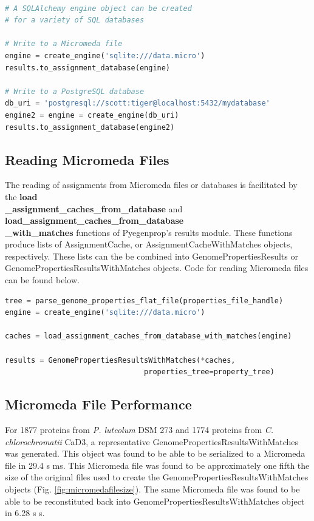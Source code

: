 \begin{lstlisting}[language=Python]  

# A SQLAlchemy engine object can be created
# for a variety of SQL databases

# Write to a Micromeda file
engine = create_engine('sqlite:///data.micro')
results.to_assignment_database(engine)

# Write to a PostgreSQL database
db_uri = 'postgresql://scott:tiger@localhost:5432/mydatabase'
engine2 = engine = create_engine(db_uri)
results.to_assignment_database(engine2)

\end{lstlisting}

\subsection{Reading Micromeda Files}

The reading of assignments from Micromeda files or databases is facilitated by the \textbf{load\\ \_assignment\_caches\_from\_database} and \textbf{load\_assignment\_caches\_from\_database \\ \_with\_matches} functions of Pyegenprop's results module. These functions produce lists of AssignmentCache, or AssignmentCacheWithMatches objects, respectively. These lists can the be combined into GenomePropertiesResults or GenomePropertiesResultsWithMatches objects. Code for reading Micromeda files can be found below.

\begin{lstlisting}[language=Python]  
tree = parse_genome_properties_flat_file(properties_file_handle)
engine = create_engine('sqlite:///data.micro')

caches = load_assignment_caches_from_database_with_matches(engine)

results = GenomePropertiesResultsWithMatches(*caches,          
                                properties_tree=property_tree)
\end{lstlisting}

\subsection{Micromeda File Performance} \label{micromeda-file-performance}

For 1877 proteins from \textit{P. luteolum} DSM 273 and 1774 proteins from \textit{C. chlorochromatii} CaD3, a representative GenomePropertiesResultsWithMatches was generated. This object was found to be able to be serialized to a Micromeda file in 29.4 s  ms. This Micromeda file was found to be approximately one fifth the size of the original files used to create the GenomePropertiesResultsWithMatches objects (Fig. \ref{fig:micromedafilesize}). The same Micromeda file was found to be able to be reconstituted back into GenomePropertiesResultsWithMatches object in 6.28 s  s.


